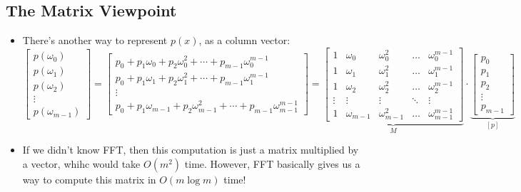 \subsection{The Matrix Viewpoint}
\begin{itemize}
	\item There's another way to represent \( p(x) \), as a column vector:
		\[
		\begin{bmatrix} p(\omega_0)\\p(\omega_1)\\p(\omega_2)\\ \vdots \\ p(\omega_{m - 1}) \end{bmatrix} = 
		\begin{bmatrix} p_0 + p_1\omega_0 + p_2 \omega_0^2 + \cdots + p_{m-1}\omega_0^{m- 1}\\
		p_0 + p_1 \omega_1 + p_2\omega_1^2 + \cdots + p_{m-1}\omega_1^{m-1}\\
	\vdots \\
p_0 + p_1\omega_{m-1} + p_2\omega_{m-1}^2 + \cdots+ p_{m-1}\omega_{m-1}^{m-1}\end{bmatrix} 
= \underbrace{\begin{bmatrix} 1 & \omega_0 & \omega_0^2 & \dots & \omega_0^{m-1}\\
1 & \omega_1 & \omega_1^2 & \dots & \omega_1^{m-1}\\
1 & \omega_2 & \omega_2^2 & \dots & \omega_2^{m-1}\\
\vdots & \vdots & \vdots & \ddots & \vdots\\
1 & \omega_{m-1} & \omega_{m-1}^2 & \dots & \omega_{m-1}^{m-1}\end{bmatrix}}_{M} \cdot \underbrace{\begin{bmatrix} p_0\\p_1\\p_2\\ \vdots \\p_{m-1} \end{bmatrix}}_{[p]} 
		\] 
	\item If we didn't know FFT, then this computation is just a matrix multiplied by a vector, whihc would take \( O(m^2) \)  
		time. However, FFT basically gives us a way to compute this matrix in \( O(m \log m) \) time!


\end{itemize}
